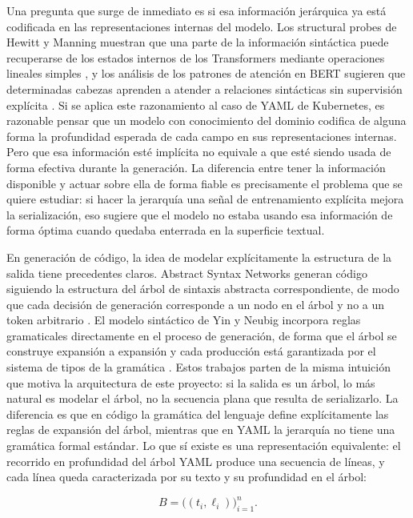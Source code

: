 Una pregunta que surge de inmediato es si esa información jerárquica ya está codificada en las representaciones internas del modelo. Los structural probes de Hewitt y Manning muestran que una parte de la información sintáctica puede recuperarse de los estados internos de los Transformers mediante operaciones lineales simples \citep{hewitt2019structural}, y los análisis de los patrones de atención en BERT sugieren que determinadas cabezas aprenden a atender a relaciones sintácticas sin supervisión explícita \citep{clark2019bert}. Si se aplica este razonamiento al caso de YAML de Kubernetes, es razonable pensar que un modelo con conocimiento del dominio codifica de alguna forma la profundidad esperada de cada campo en sus representaciones internas. Pero que esa información esté implícita no equivale a que esté siendo usada de forma efectiva durante la generación. La diferencia entre tener la información disponible y actuar sobre ella de forma fiable es precisamente el problema que se quiere estudiar: si hacer la jerarquía una señal de entrenamiento explícita mejora la serialización, eso sugiere que el modelo no estaba usando esa información de forma óptima cuando quedaba enterrada en la superficie textual.

En generación de código, la idea de modelar explícitamente la estructura de la salida tiene precedentes claros. Abstract Syntax Networks generan código siguiendo la estructura del árbol de sintaxis abstracta correspondiente, de modo que cada decisión de generación corresponde a un nodo en el árbol y no a un token arbitrario \citep{rabinovich2017asn}. El modelo sintáctico de Yin y Neubig incorpora reglas gramaticales directamente en el proceso de generación, de forma que el árbol se construye expansión a expansión y cada producción está garantizada por el sistema de tipos de la gramática \citep{yin2017syntactic}. Estos trabajos parten de la misma intuición que motiva la arquitectura de este proyecto: si la salida es un árbol, lo más natural es modelar el árbol, no la secuencia plana que resulta de serializarlo. La diferencia es que en código la gramática del lenguaje define explícitamente las reglas de expansión del árbol, mientras que en YAML la jerarquía no tiene una gramática formal estándar. Lo que sí existe es una representación equivalente: el recorrido en profundidad del árbol YAML produce una secuencia de líneas, y cada línea queda caracterizada por su texto y su profundidad en el árbol:

\[
B = \bigl((t_i, \ell_i)\bigr)_{i=1}^{n}.
\]

